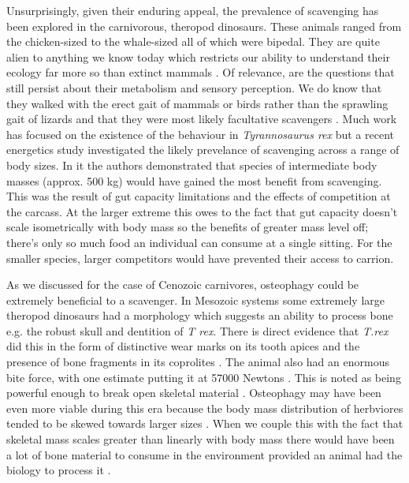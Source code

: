 \documentclass[a4paper,12pt]{article}
\begin{document}
Unsurprisingly, given their enduring appeal, the prevalence of scavenging has been explored in the carnivorous, theropod dinosaurs. These animals ranged from the chicken-sized to the whale-sized all of which were bipedal. They are quite alien to anything we know today which restricts our ability to understand their ecology far more so than extinct mammals \citep{weishampel2004dinosauria}. Of relevance, are the questions that still persist about their metabolism \citep{grady2014evidence} and sensory perception. We do know that they walked with the erect gait of mammals or birds rather than the sprawling gait of lizards and that they were most likely facultative scavengers \citep{depalma2013physical}. Much work has focused on the existence of the behaviour in \textit{Tyrannosaurus rex} \citep{ruxton2003could,carbone2011intra} but a recent energetics study investigated the likely prevelance of scavenging across a range of body sizes. In it the authors demonstrated that species of intermediate body masses (approx. 500 kg) would have gained the most benefit from scavenging. This was the result of gut capacity limitations and the effects of competition at the carcass. At the larger extreme this owes to the fact that gut capacity doesn't scale isometrically with body mass so the benefits of greater mass level off; there's only so much food an individual can consume at a single sitting. For the smaller species, larger competitors would have prevented their access to carrion. 

As we discussed for the case of Cenozoic carnivores, osteophagy could be extremely beneficial to a scavenger. 
In Mesozoic systems some extremely large theropod dinosaurs had a morphology which suggests an ability to process bone e.g. the robust skull and dentition of \textit{T rex}. There is direct evidence that \textit{T.rex} did this in the form of distinctive wear marks on its tooth apices \citep{farlow1994wear,schubert2005wear} and the presence of bone fragments in its coprolites \citep{chin1998king}. The animal also had an enormous bite force, with one estimate putting it at 57000 Newtons \citep{bates2012estimating}. This is noted as being powerful enough to break open skeletal material \citep{rayfield2001cranial}. Osteophagy may have been even more viable during this era because the body mass distribution of herbviores tended to be skewed towards larger sizes \citep{10.1371/journal.pone.0051925}. When we couple this with the fact that skeletal mass scales greater than linearly with body mass \citep{prange1979scaling} there would have been a lot of bone material to consume in the environment provided an animal had the biology to process it  \citep{chure1997one}. 
\end{document}
